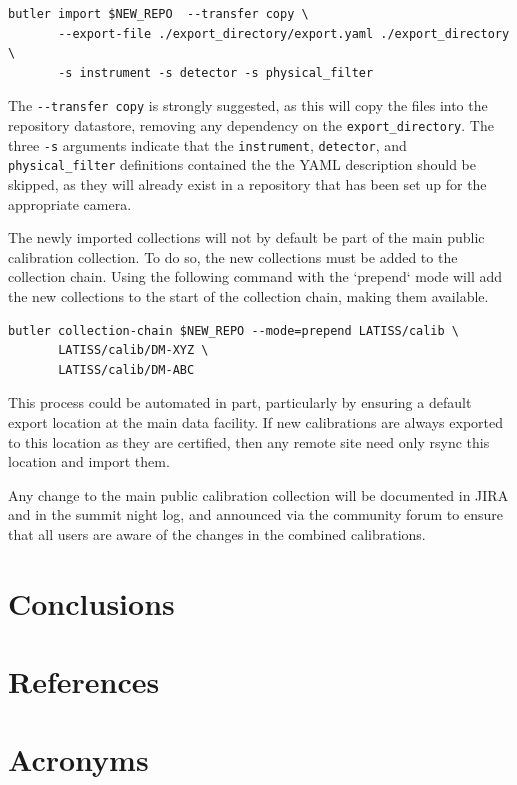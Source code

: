 \documentclass[DM,authoryear,toc]{lsstdoc}
\begin{document}
\begin{verbatim}
butler import $NEW_REPO  --transfer copy \
       --export-file ./export_directory/export.yaml ./export_directory \
       -s instrument -s detector -s physical_filter
\end{verbatim}

The \verb|--transfer copy| is strongly suggested, as this will copy the files into the repository datastore, removing any dependency on the \verb|export_directory|.  The three \verb|-s| arguments indicate that the \verb|instrument|, \verb|detector|, and \verb|physical_filter| definitions contained the the YAML description should be skipped, as they will already exist in a repository that has been set up for the appropriate camera.

The newly imported collections will not by default be part of the main public calibration collection.  To do so, the new collections must be added to the collection chain.  Using the following command with the `prepend` mode will add the new collections to the start of the collection chain, making them available.

\begin{verbatim}
butler collection-chain $NEW_REPO --mode=prepend LATISS/calib \
       LATISS/calib/DM-XYZ \
       LATISS/calib/DM-ABC
\end{verbatim}

This process could be automated in part, particularly by ensuring a default export location at the main data facility.  If new calibrations are always exported to this location as they are certified, then any remote site need only rsync this location and import them.

Any change to the main public calibration collection will be documented in JIRA and in the summit night log, and announced via the community forum to ensure that all users are aware of the changes in the combined calibrations.

\section{Conclusions}

\appendix
\section{References} \label{sec:bib}
\renewcommand{\refname}{} %


\section{Acronyms} \label{sec:acronyms}

\end{document}
